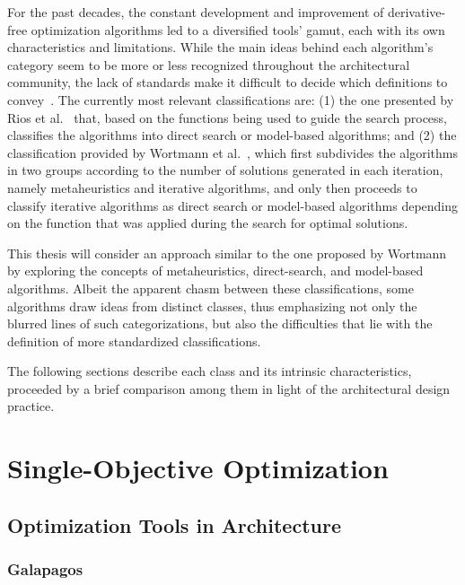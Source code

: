	For the past decades, the constant development and improvement of derivative-free optimization algorithms led to a diversified tools' gamut, each with its own characteristics and limitations. While the main ideas behind each algorithm's category seem to be more or less recognized throughout the architectural community, the lack of standards make it difficult to decide which definitions to convey~\cite{Rios2013, Wortmann2017ADO}. The currently most relevant classifications are: (1) the one presented by Rios et al.~\cite{Rios2013} that, based on the functions being used to guide the search process, classifies the algorithms into direct search or model-based algorithms; and (2) the classification provided by Wortmann et al.~\cite{Wortmann2017ADO}, which first subdivides the algorithms in two groups according to the number of solutions generated in each iteration, namely metaheuristics and iterative algorithms, and only then proceeds to classify iterative algorithms as direct search or model-based algorithms depending on the function that was applied during the search for optimal solutions. 

	This thesis will consider an approach similar to the one proposed by Wortmann~\cite{Wortmann2017ADO} by exploring the concepts of metaheuristics, direct-search, and model-based algorithms. Albeit the apparent chasm between these classifications, some algorithms draw ideas from distinct classes, thus emphasizing not only the blurred lines of such categorizations, but also the difficulties that lie with the definition of more standardized classifications. 
	
	The following sections describe each class and its intrinsic characteristics, proceeded by a brief comparison among them in light of the architectural design practice. 	
\section{Single-Objective Optimization}


\subsection{Optimization Tools in Architecture}

\subsubsection{Galapagos}

